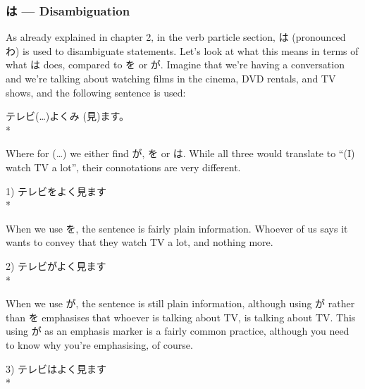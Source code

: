 \documentclass[11pt, b5paper, twoside, openright, onecolumn]{book}
\makeatletter
\newcommand*{\rubystack}[2]{{\relscale{0.5}%
  \begin{tabular}[b]{@{}c@{}}%
    {#1}\\%
   {\textscale{2}{#2}}%
  \end{tabular}}%
}
\DeclareRobustCommand*{\ruby}[2]{%
  \mbox{%
    \setlength{\parskip}{0ex}%
    \BeginAccSupp{method=pdfstringdef,ActualText={#1}}%
      \rubystack{\phantom{#2}}{#1}%
      \llap{%
        \rubystack{#2}{\phantom{#1}}%
      }%
    \EndAccSupp{}%
  }%
}
\renewcommand*{\ruby}[2]{#2 (#1)}%
\newenvironment{exampleblock}{
\setlength{\parindent}{0.6in}
\begin{minipage}[t]{\dimexpr\textwidth-\parindent}}
{\end{minipage}}
\makeatother
\begin{document}
\subsubsection{は — Disambiguation}

As already explained in chapter 2‚ in the verb particle section‚ は (pronounced わ) is used to disambiguate statements. Let’s look at what this means in terms of what は does‚ compared to を or が. Imagine that we’re having a conversation and we’re talking about watching films in the cinema‚ DVD rentals‚ and TV shows‚ and the following sentence is used:

\vspace{0.4cm}
\begin{exampleblock}
テレビ(…)よく\ruby{見}{み}ます。 \\* 
\end{exampleblock}
\vspace{0.2cm}

Where for (…) we either find が‚ を or は. While all three would translate to “(I) watch TV a lot”‚ their connotations are very different.

\vspace{0.4cm}
\begin{exampleblock}
1) テレビをよく見ます \\* 
\end{exampleblock}
\vspace{0.2cm}

When we use を‚ the sentence is fairly plain information. Whoever of us says it wants to convey that they watch TV a lot‚ and nothing more.

\vspace{0.4cm}
\begin{exampleblock}
2) テレビがよく見ます \\* 
\end{exampleblock}
\vspace{0.2cm}

When we use が‚ the sentence is still plain information‚ although using が rather than を emphasises that whoever is talking about TV‚ is talking about TV. This using が as an emphasis marker is a fairly common practice‚ although you need to know why you’re emphasising‚ of course.

\vspace{0.4cm}
\begin{exampleblock}
3) テレビはよく見ます \\* 
\end{exampleblock}
\vspace{0.2cm}
\end{document}
